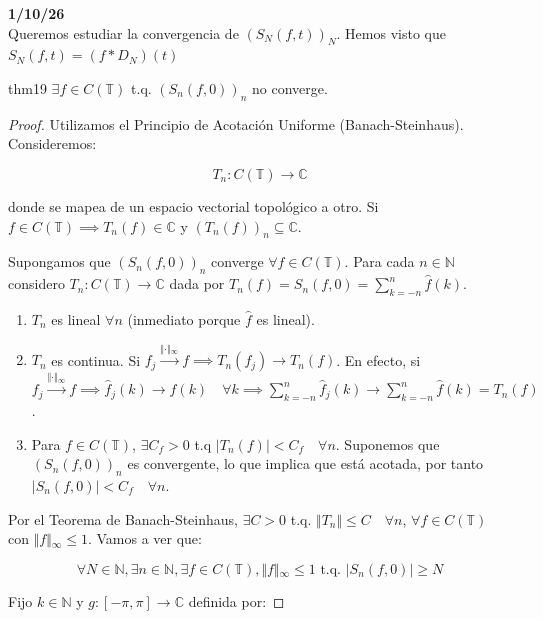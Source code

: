 \textbf{1/10/26} 
\\
Queremos estudiar la convergencia de $(S_N(f,t))_N$. Hemos visto que $S_N(f,t) = (f * D_N)(t)$

\begin{teorema}{}{thm19}
$\exists f \in C(\mathbb{T})$ t.q. $(S_n(f,0))_n$ no converge.
\end{teorema}

\begin{proof}
Utilizamos el Principio de Acotación Uniforme (Banach-Steinhaus). Consideremos:


$$T_n : C(\mathbb{T}) \longrightarrow \mathbb{C}$$


donde se mapea de un espacio vectorial topológico a otro. Si $f \in C(\mathbb{T}) \implies T_n(f) \in \mathbb{C}$ y $(T_n(f))_n \subseteq \mathbb{C}$.

Supongamos que $(S_n(f,0))_n$ converge $\forall f \in C(\mathbb{T})$. Para cada $n \in \mathbb{N}$ considero $T_n: C(\mathbb{T}) \longrightarrow \mathbb{C}$ dada por $T_n(f) = S_n(f,0) = \sum_{k=-n}^n \hat{f}(k)$.

\begin{enumerate}
\item[(a)] $T_n$ es lineal $\forall n$ (inmediato porque $\hat{f}$ es lineal).
\item[(b)] $T_n$ es continua. Si $f_j \xrightarrow{\Vert{}\cdot\Vert{}_\infty} f \implies T_n(f_j) \rightarrow T_n(f)$.
En efecto, si $f_j \xrightarrow{\Vert{}\cdot\Vert{}_\infty} f \implies \hat{f}_j(k) \rightarrow \hat{f}(k) \quad \forall k \implies \sum_{k=-n}^n \hat{f}_j(k) \rightarrow \sum_{k=-n}^n \hat{f}(k) = T_n(f)$.
\item[(c)] Para $f \in C(\mathbb{T})$, $\exists C_f > 0$ t.q $\vert{}T_n(f)\vert{} < C_f \quad \forall n$. Suponemos que $(S_n(f,0))_n$ es convergente, lo que implica que está acotada, por tanto $\vert{}S_n(f,0)\vert{} < C_f \quad \forall n$.
\end{enumerate}

Por el Teorema de Banach-Steinhaus, $\exists C > 0$ t.q. $\Vert{}T_n\Vert{} \le C \quad \forall n$, $\forall f \in C(\mathbb{T})$ con $\Vert{}f\Vert{}_\infty \le 1$. Vamos a ver que:


$$\forall N \in \mathbb{N}, \exists n \in \mathbb{N}, \exists f \in C(\mathbb{T}), \Vert{}f\Vert{}_\infty \le 1 \text{ t.q. } \vert{}S_n(f,0)\vert{} \ge N $$

Fijo $k \in \mathbb{N}$ y $g: [-\pi, \pi] \rightarrow \mathbb{C}$ definida por:



\end{proof}

